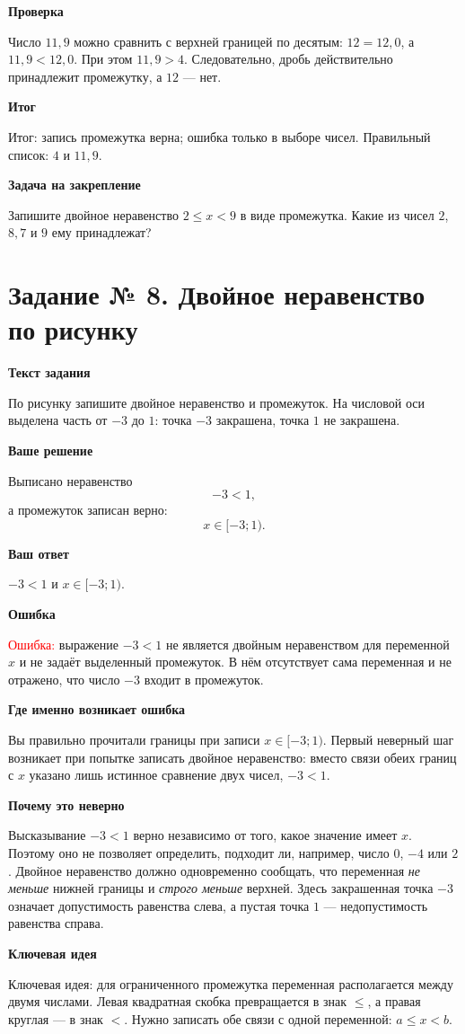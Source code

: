 \documentclass[12pt,a4paper]{article}
\newcommand{\reviewlabel}[1]{\medskip\noindent\textbf{#1}\par}
\begin{document}
\reviewlabel{Проверка}
Число $11{,}9$ можно сравнить с верхней границей по десятым: $12=12{,}0$, а $11{,}9<12{,}0$. При этом $11{,}9>4$. Следовательно, дробь действительно принадлежит промежутку, а $12$ --- нет.

\reviewlabel{Итог}
\textcolor{teal!60!black}{Итог:} запись промежутка верна; ошибка только в выборе чисел. Правильный список: $4$ и $11{,}9$.

\reviewlabel{Задача на закрепление}
Запишите двойное неравенство $2\le x<9$ в виде промежутка. Какие из чисел $2$, $8{,}7$ и $9$ ему принадлежат?
\newpage

\label{task:8}
\section*{Задание № 8. Двойное неравенство по рисунку}
\reviewlabel{Текст задания}
По рисунку запишите двойное неравенство и промежуток. На числовой оси выделена часть от $-3$ до $1$: точка $-3$ закрашена, точка $1$ не закрашена.

\reviewlabel{Ваше решение}
Выписано неравенство
\[
 -3<1,
\]
а промежуток записан верно:
\[
 x\in[-3;1).
\]

\reviewlabel{Ваш ответ}
$\displaystyle -3<1$ и $\displaystyle x\in[-3;1)$.

\reviewlabel{Ошибка}
\textcolor{red}{Ошибка:} выражение $-3<1$ не является двойным неравенством для переменной $x$ и не задаёт выделенный промежуток. В нём отсутствует сама переменная и не отражено, что число $-3$ входит в промежуток.

\reviewlabel{Где именно возникает ошибка}
Вы правильно прочитали границы при записи $x\in[-3;1)$. Первый неверный шаг возникает при попытке записать двойное неравенство: вместо связи обеих границ с $x$ указано лишь истинное сравнение двух чисел, $-3<1$.

\reviewlabel{Почему это неверно}
Высказывание $-3<1$ верно независимо от того, какое значение имеет $x$. Поэтому оно не позволяет определить, подходит ли, например, число $0$, $-4$ или $2$. Двойное неравенство должно одновременно сообщать, что переменная \emph{не меньше} нижней границы и \emph{строго меньше} верхней. Здесь закрашенная точка $-3$ означает допустимость равенства слева, а пустая точка $1$ --- недопустимость равенства справа.

\reviewlabel{Ключевая идея}
\textcolor{blue!60!black}{Ключевая идея:} для ограниченного промежутка переменная располагается между двумя числами. Левая квадратная скобка превращается в знак $\le$, а правая круглая --- в знак $<$. Нужно записать обе связи с одной переменной: $a\le x<b$.
\end{document}
